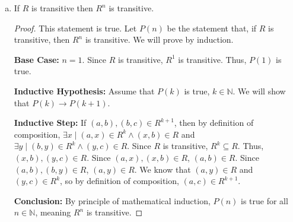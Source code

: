 \documentclass[article, 12pt]{article}
\theoremstyle{definition}
\newcommand{\comp}{\circ} %
\newcommand{\nats}{\mathbb{N}}
\begin{document}
{\begin{enumerate}[a.]
\begin{proof}
            \textbf{Inductive Step:} $R^{k+1} = R^k \comp R$. By definition of composition, $\forall x\forall y \forall z \in A ((x,y) \in R \land (y,z) \in R^k \leftrightarrow (x,z) \in R^{k+1})$. The elements of $R^k \comp R$ are $(x,z)$, where $(x,y)$ is in $R^k$ and $(x,z)$ is in $R$. As $R^k$ is symmetric, $\forall x\forall y \in A ((x,y) \in R \leftrightarrow (y,x) \in R)$. As $R$ is symmetric, $\forall y \forall z ((y,z) \in R^k \leftrightarrow (z,y) \in R^k)$. Thus, $(z,x)$ is in $R^k \comp R$, where $(y,x)$ is in $R$ and $(z,x)$ is in $R^k$. Therefore, by definition of symmetry, $R^{k+1}$ is symmetric, meaning $P(k) \to P(k+1)$ is true.

            \textbf{Conclusion:} By principle of mathematical induction, $P(n)$ is true for all $n \in \nats$, meaning $R^n$ is reflexive.     
        \end{proof}
        \item If $R$ is transitive then $R^n$ is transitive.
        \begin{proof}
            This statement is true. Let $P(n)$ be the statement that, if $R$ is transitive, then $R^n$ is transitive. We will prove by induction.

            \textbf{Base Case:} $n = 1$. Since $R$ is transitive, $R^1$ is transitive. Thus, $P(1)$ is true.

            \textbf{Inductive Hypothesis:} Assume that $P(k)$ is true, $k \in \nats$. We will show that $P(k) \to P(k+1)$.

            \textbf{Inductive Step:} If $(a,b),(b,c)\in R^{k+1}$, then by definition of composition, $\exists x \mid (a,x) \in R^k \land (x,b) \in R$ and $\exists y \mid (b,y) \in R^k \land (y, c) \in R$. Since $R$ is transitive, $R^k\subseteq R$. Thus, $(x,b),(y,c)\in R$. Since $(a,x),(x,b)\in R$, $(a,b)\in R$. Since $(a,b),(b,y)\in R$, $(a,y)\in R$. We know that $(a,y)\in R$ and $(y,c)\in R^k$, so by definition of composition, $(a,c)\in R^{k+1}$.

            \textbf{Conclusion:} By principle of mathematical induction, $P(n)$ is true for all $n \in \nats$, meaning $R^n$ is transitive.
        \end{proof}
    \end{enumerate}}
    
\end{document}

